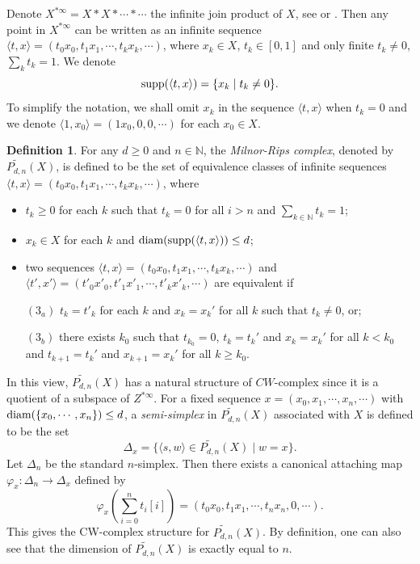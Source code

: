 \documentclass[11pt]{article}
\theoremstyle{definition}
\newtheorem{Def}{Definition}[section]
\theoremstyle{plain}
\def\IN{\mathbb N}\def\IR{\mathbb R}\def\IE{\mathbb E}\def\IC{\mathbb C}\def\IL{\mathbb L}\def\IQ{\mathbb Q}\def\IA{\mathbb A}\def\IZ{\mathbb Z}
\def\MRdnX{\widetilde{P_{d,n}}(X)}
\def\supp{\textup{supp}}
\def\diam{\textup{diam}}
\begin{document}
 Denote $X^{*\infty}=X*X*\cdots*\cdots$ the infinite join product of $X$, see \cite{Milnor56} or \cite[Definition 11.1]{GTM20}. Then any point in $X^{*\infty}$ can be written as an infinite sequence $\langle t,x\rangle=(t_0x_0,t_1x_1,\cdots,t_kx_k,\cdots)$, where $x_k\in X$, $t_k\in[0,1]$ and only finite $t_k\ne 0$, $\sum_{k}t_k=1$. We denote
$$\supp(\langle t,x\rangle)=\{x_k\mid t_k\ne 0\}.$$
To simplify the notation, we shall omit $x_k$ in the sequence $\langle t,x\rangle$ when $t_k=0$ and we denote $\langle 1,x_0\rangle=(1x_0,0,0,\cdots)$ for each $x_0\in X$.

\begin{Def}\label{Milnor Rips}
For any $d\geq 0$ and $n\in\IN$, the \emph{Milnor-Rips complex}, denoted by $\MRdnX$, is defined to be the set of equivalence classes of infinite sequences $\langle t,x\rangle=(t_0x_0,t_1x_1,\cdots,t_kx_k,\cdots)$, where
\begin{itemize}
\item[(1)]$t_k\geq0$ for each $k$ such that $t_k=0$ for all $i>n$ and $\sum_{k\in\IN}t_k=1$;
\item[(2)]$x_k\in X$ for each $k$ and $\diam(\supp(\langle t,x\rangle))\leq d$;
\item[(3)]two sequences $\langle t,x\rangle=(t_0x_0,t_1x_1,\cdots,t_kx_k,\cdots)$ and $\langle t',x'\rangle=(t'_0x'_0,t'_1x'_1,\cdots,t'_kx'_k,\cdots)$ are equivalent if
\par $(3_a)$ $t_k=t'_k$ for each $k$ and $x_k=x_k'$ for all $k$ such that $t_k\ne 0$, or;
\par $(3_b)$ there exists $k_0$ such that $t_{k_0}=0$, $t_k=t_k'$ and $x_k=x_k'$ for all $k<k_0$ and $t_{k+1}=t_k'$ and $x_{k+1}=x_k'$ for all $k\geq k_0$.
\end{itemize}\end{Def}

In this view, $\MRdnX$ has a natural structure of $CW$-complex since it is a quotient of a subspace of $Z^{*\infty}$. For a fixed sequence $x=(x_0,x_1,\cdots,x_n,\cdots)$ with $\diam(\{x_0,\cdots,x_n\})\leq d$, a \emph{semi-simplex} in $\MRdnX$ associated with $X$ is defined to be the set
$$\Delta_{x}=\{\langle s,w\rangle\in\MRdnX\mid w=x\}.$$
Let $\Delta_n$ be the standard $n$-simplex. Then there exists a canonical attaching map $\varphi_x:\Delta_n\to\Delta_x$ defined by
$$\varphi_x\left(\sum_{i=0}^nt_i[i]\right)=(t_0x_0,t_1x_1,\cdots,t_nx_n,0,\cdots).$$
This gives the CW-complex structure for $\MRdnX$. By definition, one can also see that the dimension of $\MRdnX$ is exactly equal to $n$.
\end{document}

